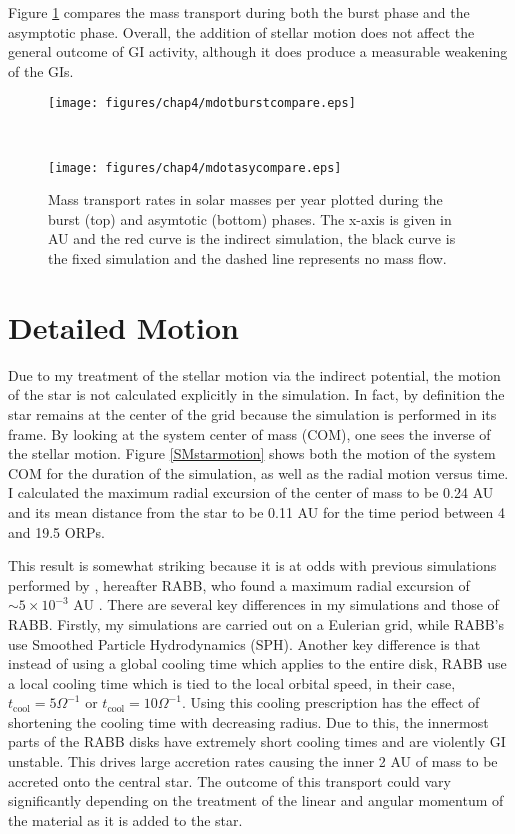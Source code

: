 Figure \ref{SMmdots} compares the mass transport during both the burst phase and the asymptotic phase. Overall, the addition of stellar motion does not affect the general outcome of GI activity, although it does produce a measurable weakening of the GIs.
\begin{figure}[p]
\centering
{}
\begin{minipage}[t]{6.3in}
\centering
\texttt{[image: figures/chap4/mdotburstcompare.eps]}
\end{minipage}\\
\begin{minipage}[t]{6.3in}
\centering
\texttt{[image: figures/chap4/mdotasycompare.eps]}
\end{minipage}
\caption[Comparison of Indirect and Standard run mass transport rates for the burst and asymptotic phases]{Mass transport rates in solar masses per year plotted during the burst (top) and asymtotic (bottom) phases. The x-axis is given in AU and the red curve is the indirect simulation, the black curve is the fixed simulation and the dashed line represents no mass flow.}
\label{SMmdots}
\end{figure}

\section{Detailed Motion}\label{SMdetailed}

Due to my treatment of the stellar motion via the indirect potential, the motion of the star is not calculated explicitly in the simulation. In fact, by definition the star remains at the center of the grid because the simulation is performed in its frame. By looking at the system center of mass (COM), one sees the inverse of the stellar motion. Figure \ref{SMstarmotion} shows both the motion of the system COM for the duration of the simulation, as well as the radial motion versus time. I calculated the maximum radial excursion of the center of mass to be 0.24 AU and its mean distance from the star to be 0.11 AU for the time period between 4 and 19.5 ORPs. 

This result is somewhat striking because it is at odds with previous simulations performed by \citet{rice2003a}, hereafter RABB, who found a maximum radial excursion of $\sim 5 \times 10^{-3}$ AU . There are several key differences in my simulations and those of RABB. Firstly, my simulations are carried out on a Eulerian grid, while RABB's use Smoothed Particle Hydrodynamics (SPH). Another key difference is that instead of using a global cooling time which applies to the entire disk, RABB use a local cooling time which is tied to the local orbital speed, in their case, $t_{\mathrm{cool}} = 5\Omega^{-1}$ or $t_{\mathrm{cool}} = 10\Omega^{-1}$. Using this cooling prescription has the effect of shortening the cooling time with decreasing radius. Due to this, the innermost parts of the RABB disks have extremely short cooling times and are violently GI unstable. This drives large accretion rates causing the inner 2 AU of mass to be accreted onto the central star. The outcome of this transport could vary significantly depending on the treatment of the linear and angular momentum of the material as it is added to the star. 


